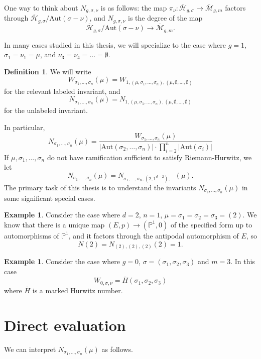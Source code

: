 \documentclass[thesis]{thesis-umich}           %
\newcommand{\mb}{\overline{\mathcal M}}
\newcommand{\Aut}{\text{Aut}}
\newcommand{\Hb}{\overline{\mathcal H}}
\renewcommand{\P}{\mathbb P}
\theoremstyle{definition}
\newtheorem{dfn}[thm]{Definition}
\newtheorem{eg}[thm]{Example}
\begin{document}
One way to think about $N_{g,\sigma,\nu}$ is as follows: the map
$\pi_{\nu}:\Hb_{g,\sigma}\to\mb_{g,m}$ factors through
$\Hb_{g,\sigma}/\Aut(\sigma-\nu)$, and $N_{g,\sigma,\nu}$ is the degree of the map
\[
\Hb_{g,\sigma}/\Aut(\sigma-\nu)\to\mb_{g,m}.
\]

In many cases studied in this thesis, we will specialize to the case where $g=1$,
$\sigma_1=\nu_1=\mu$, and $\nu_3=\nu_4=\dots=\emptyset$.
\begin{dfn}
  We will write
\[
W_{\sigma_1,\dots,\sigma_n}(\mu)=W_{1,(\mu,\sigma_1,\dots,\sigma_n),(\mu,\emptyset,\dots,\emptyset)}
\]
for the relevant labeled invariant, and
\[
N_{\sigma_1,\dots,\sigma_n}(\mu)=N_{1,(\mu,\sigma_1,\dots,\sigma_n),(\mu,\emptyset,\dots,\emptyset)}
\]
for the unlabeled invariant.\end{dfn}
In particular,
\[
N_{\sigma_1,\dots,\sigma_n}(\mu)=\frac{W_{\sigma_1,\dots,\sigma_n}(\mu)}{|\Aut(\sigma_2,\dots,\sigma_n)|\cdot\prod_{i=2}^n|\Aut(\sigma_i)|}
\]
If $\mu,\sigma_1,\dots,\sigma_n$ do not have ramification sufficient to satisfy Riemann-Hurwitz,
we let \[N_{\sigma_1,\dots,\sigma_n}(\mu) = N_{\sigma_1,\dots,\sigma_n,(2,1^{d-2}),\dots}(\mu).\]
The primary task of this thesis is to understand the invariants $N_{\sigma_1,\dots,\sigma_n}(\mu)$
in some significant special cases.

\begin{eg}
  Consider the case where $d=2$, $n=1$, $\mu=\sigma_1=\sigma_2=\sigma_3=(2)$.
  We know that there is a unique map $(E,p)\to (\mathbb P^1,0)$ of the specified form
  up to automorphisms of $\P^1$, and it factors through the antipodal automorphism of $E$,
  so
  \[
  N(2)=N_{(2),(2),(2)}(2)=1.
  \]
\end{eg}

\begin{eg}
  Consider the case where $g=0$, $\sigma=(\sigma_1,\sigma_2,\sigma_3)$ and $m=3$. In this case
  \[
  W_{0,\sigma,\nu}=\overline H(\sigma_1,\sigma_2,\sigma_3)
  \]
  where $\overline H$ is a marked Hurwitz number.
  \end{eg}

\section{Direct evaluation}
\label{section:direct1}
We can interpret $N_{\sigma_1,\dots,\sigma_n}(\mu)$ as follows.
\end{document}
